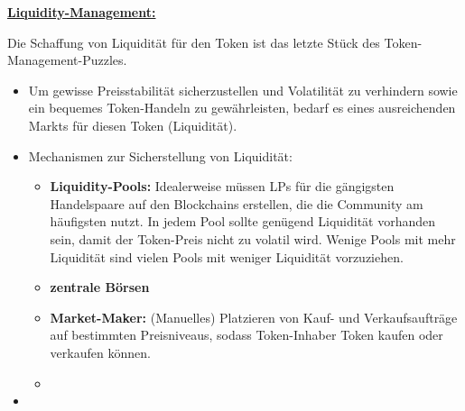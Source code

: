 \begin{Zitat*}
\vspace{0.3cm}
\underline{\textbf{Liquidity-Management:}}

\vspace{0.2cm}

Die Schaffung von Liquidität für den Token ist das letzte Stück des Token-Management-Puzzles. 

\begin{itemize}
  \item Um gewisse Preisstabilität sicherzustellen und Volatilität zu verhindern sowie ein bequemes Token-Handeln zu gewährleisten, bedarf es eines ausreichenden Markts für diesen Token (Liquidität).
  \item Mechanismen zur Sicherstellung von Liquidität:
  \begin{itemize}
	\item \textbf{Liquidity-Pools:} Idealerweise müssen LPs für die gängigsten Handelspaare auf den Blockchains erstellen, die die Community am häufigsten nutzt. In jedem Pool sollte genügend Liquidität vorhanden sein, damit der Token-Preis nicht zu volatil wird. Wenige Pools mit mehr Liquidität sind vielen Pools mit weniger Liquidität vorzuziehen.
	\item \textbf{zentrale Börsen}
	\item \textbf{Market-Maker:} (Manuelles) Platzieren von Kauf- und Verkaufsaufträge auf bestimmten Preisniveaus, sodass Token-Inhaber Token kaufen oder verkaufen können.
	\item 
  \end{itemize}
  \item
\end{itemize}

\end{Zitat*}

\vspace{0.5cm}
